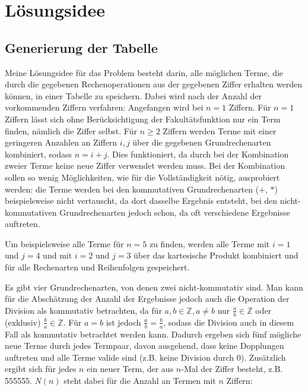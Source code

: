 \documentclass[a4paper,10pt,ngerman]{scrartcl}
\title{\Aufgabe}
\author{\Name\\Team-ID: \Einsendenummer}
\date{\today}
\begin{document}
\maketitle
\setcounter{tocdepth}{2}
\tableofcontents

\section{Lösungsidee}
\label{sec:idea}
\subsection{Generierung der Tabelle}
\label{sec:idea:generate}
Meine Lösungsidee für das Problem besteht darin, alle möglichen Terme, die durch die gegebenen Rechenoperationen aus der gegebenen Ziffer erhalten werden können, in einer Tabelle zu speichern.
Dabei wird nach der Anzahl der vorkommenden Ziffern verfahren:
Angefangen wird bei $n=1$ Ziffern.
Für $n=1$ Ziffern lässt sich ohne Berücksichtigung der Fakultätsfunktion nur ein Term finden, nämlich die Ziffer selbst.
Für $ n \geq 2$ Ziffern werden Terme mit einer geringeren Anzahlen an Ziffern $i,j$ über die gegebenen Grundrechenarten kombiniert, sodass $n=i+j$.
Dies funktioniert, da durch bei der Kombination zweier Terme keine neue Ziffer verwendet werden muss.
Bei der Kombination sollen so wenig Möglichkeiten, wie für die Vollständigkeit nötig, ausprobiert werden: die Terme werden bei den kommutativen Grundrechenarten ($+$, $*$) beispielsweise nicht vertauscht, da dort dasselbe Ergebnis entsteht, bei den nicht-kommutativen Grundrechenarten jedoch schon, da oft verschiedene Ergebnisse auftreten.

Um beispielsweise alle Terme für $n=5$ zu finden, werden alle Terme mit $i=1$ und $j=4$ und mit $i=2$ und $j=3$ über das kartesische Produkt kombiniert und für alle Rechenarten und Reihenfolgen gespeichert.

Es gibt vier Grundrechenarten, von denen zwei nicht-kommutativ sind.
Man kann für die Abschätzung der Anzahl der Ergebnisse jedoch auch die Operation der Division als kommutativ betrachten, da für $a,b \in \mathbb{Z}, a \neq b$ nur $\frac{a}{b} \in \mathbb{Z}$ oder (exklusiv) $\frac{b}{a} \in \mathbb{Z}$.
Für $a = b$ ist jedoch $\frac{a}{b} = \frac{b}{a}$, sodass die Division auch in diesem Fall als kommutativ betrachtet werden kann.
Dadurch ergeben sich fünf mögliche neue Terme durch jedes Termpaar, davon ausgehend, dass keine Dopplungen auftreten und alle Terme valide sind (z.B. keine Division durch 0).
Zusätzlich ergibt sich für jedes $n$ ein neuer Term, der aus $n$-Mal der Ziffer besteht, z.B. 555555.
$N(n)$ steht dabei für die Anzahl an Termen mit $n$ Ziffern:
\end{document}
